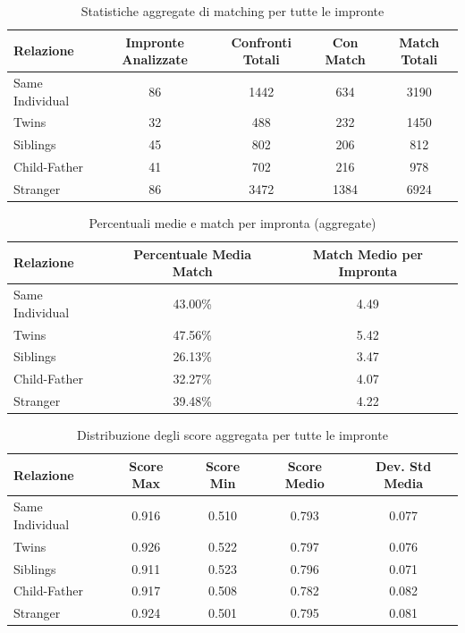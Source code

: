 \begin{table}[htbp]
\centering
\caption{Statistiche aggregate di matching per tutte le impronte}
\label{tab:aggregate_results}
\begin{tabular}{|l|c|c|c|c|}
\hline
\textbf{Relazione} & \textbf{Impronte Analizzate} & \textbf{Confronti Totali} & \textbf{Con Match} & \textbf{Match Totali} \\
\hline
Same Individual & 86 & 1442 & 634 & 3190 \\
\hline
Twins & 32 & 488 & 232 & 1450 \\
\hline
Siblings & 45 & 802 & 206 & 812 \\
\hline
Child-Father & 41 & 702 & 216 & 978 \\
\hline
Stranger & 86 & 3472 & 1384 & 6924 \\
\hline
\end{tabular}
\end{table}


\begin{table}[htbp]
\centering
\caption{Percentuali medie e match per impronta (aggregate)}
\label{tab:aggregate_percentages}
\begin{tabular}{|l|c|c|}
\hline
\textbf{Relazione} & \textbf{Percentuale Media Match} & \textbf{Match Medio per Impronta} \\
\hline
Same Individual & 43.00\% & 4.49 \\
\hline
Twins & 47.56\% & 5.42 \\
\hline
Siblings & 26.13\% & 3.47 \\
\hline
Child-Father & 32.27\% & 4.07 \\
\hline
Stranger & 39.48\% & 4.22 \\
\hline
\end{tabular}
\end{table}


\begin{table}[htbp]
\centering
\caption{Distribuzione degli score aggregata per tutte le impronte}
\label{tab:aggregate_scores}
\begin{tabular}{|l|c|c|c|c|}
\hline
\textbf{Relazione} & \textbf{Score Max} & \textbf{Score Min} & \textbf{Score Medio} & \textbf{Dev. Std Media} \\
\hline
Same Individual & 0.916 & 0.510 & 0.793 & 0.077 \\
\hline
Twins & 0.926 & 0.522 & 0.797 & 0.076 \\
\hline
Siblings & 0.911 & 0.523 & 0.796 & 0.071 \\
\hline
Child-Father & 0.917 & 0.508 & 0.782 & 0.082 \\
\hline
Stranger & 0.924 & 0.501 & 0.795 & 0.081 \\
\hline
\end{tabular}
\end{table}

